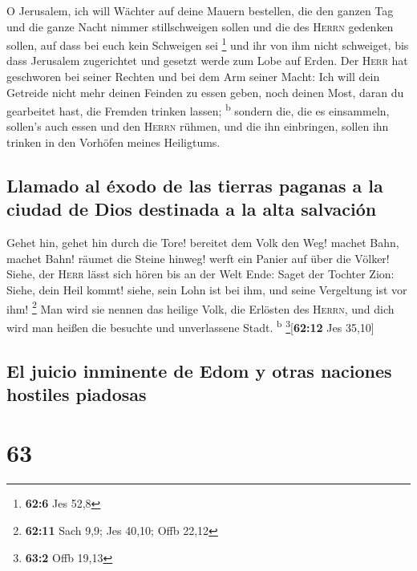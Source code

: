  O Jerusalem, ich will Wächter auf deine Mauern bestellen,
die den ganzen Tag und die ganze Nacht nimmer stillschweigen sollen und
die des \textsc{Herrn} gedenken sollen, auf dass bei euch kein Schweigen
sei \footnote{\textbf{62:6} Jes 52,8}  und ihr von ihm
nicht schweiget, bis dass Jerusalem zugerichtet und gesetzt werde zum
Lobe auf Erden.  Der \textsc{Herr} hat geschworen bei
seiner Rechten und bei dem Arm seiner Macht: Ich will dein Getreide
nicht mehr deinen Feinden zu essen geben, noch deinen Most, daran du
gearbeitet hast, die Fremden trinken lassen; \textsuperscript{b}
 sondern die, die es einsammeln, sollen's auch essen und
den \textsc{Herrn} rühmen, und die ihn einbringen, sollen ihn trinken in
den Vorhöfen meines Heiligtums.

\hypertarget{llamado-al-uxe9xodo-de-las-tierras-paganas-a-la-ciudad-de-dios-destinada-a-la-alta-salvaciuxf3n}{%
\subsection{Llamado al éxodo de las tierras paganas a la ciudad de Dios
destinada a la alta
salvación}\label{llamado-al-uxe9xodo-de-las-tierras-paganas-a-la-ciudad-de-dios-destinada-a-la-alta-salvaciuxf3n}}

 Gehet hin, gehet hin durch die Tore! bereitet dem Volk
den Weg! machet Bahn, machet Bahn! räumet die Steine hinweg! werft ein
Panier auf über die Völker!  Siehe, der \textsc{Herr}
lässt sich hören bis an der Welt Ende: Saget der Tochter Zion: Siehe,
dein Heil kommt! siehe, sein Lohn ist bei ihm, und seine Vergeltung ist
vor ihm! \footnote{\textbf{62:11} Sach 9,9; Jes 40,10; Offb 22,12}
 Man wird sie nennen das heilige Volk, die Erlösten des
\textsc{Herrn}, und dich wird man heißen die besuchte und unverlassene
Stadt. \textsuperscript{b} \footnote{\textbf{63:2} Offb 19,13}{[}\textbf{62:12}
Jes 35,10{]}

\hypertarget{el-juicio-inminente-de-edom-y-otras-naciones-hostiles-piadosas}{%
\subsection{El juicio inminente de Edom y otras naciones hostiles
piadosas}\label{el-juicio-inminente-de-edom-y-otras-naciones-hostiles-piadosas}}

\hypertarget{section-62}{%
\section{63}\label{section-62}}

